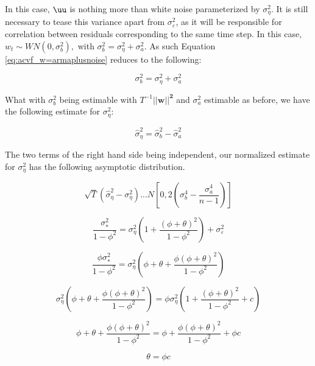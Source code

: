 
In this case, $\uu$ is nothing more than white noise parameterized by $\sigma_\eta^2$. It is still necessary to tease this variance apart from $\sigma_\varepsilon^2$, as it will be responsible for correlation between residuals corresponding to the same time step. In this case, $w_t \sim WN(0,\sigma_b^2),$ with $\sigma_b^2 = \sigma_\eta^2 + \sigma_a^2$. As such Equation \ref{eq:acvf_w=armaplusnoise} reduces to the following:

$$ \sigma_b^2 = \sigma_\eta^2 + \sigma_a^2 $$

What with $\sigma_b^2$ being estimable with $T^{-1}||\mathbf{w||^2}$ and $\sigma_a^2$ estimable as before, we have the following estimate for $\sigma_\eta^2$:

$$ \hat{\sigma}_\eta^2 = \hat{\sigma}_b^2 - \hat{\sigma}_a^2 $$

The two terms of the right hand side being independent, our normalized estimate for $\sigma_\eta^2$ has the following asymptotic distribution.

$$ \sqrt{T}(\hat{\sigma}_\eta^2 - \sigma_\eta^2) ... N\left[0,2\left(\sigma_b^4 - \frac{\sigma_a^4}{n-1}\right)\right] $$


$$ \frac{\sigma_*^2}{1-\phi^2} = \sigma_\eta^2(1 + \frac{(\phi + \theta)^2}{1 - \phi^2}) + \sigma_\varepsilon^2 $$

$$ \frac{\phi\sigma_*^2}{1-\phi^2} = \sigma_\eta^2(\phi + \theta + \frac{\phi(\phi + \theta)^2}{1 - \phi^2}) $$


$$ \sigma_\eta^2(\phi + \theta + \frac{\phi(\phi + \theta)^2}{1 - \phi^2}) = \phi\sigma_\eta^2(1 + \frac{(\phi + \theta)^2}{1 - \phi^2} + c)$$

$$ \phi + \theta + \frac{\phi(\phi + \theta)^2}{1 - \phi^2} = \phi + \frac{\phi(\phi + \theta)^2}{1 - \phi^2} + \phi c$$

$$ \theta  =  \phi c$$



